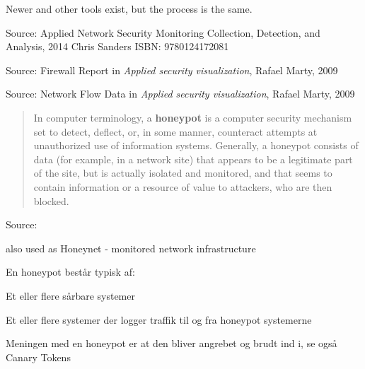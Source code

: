 \documentclass[Screen16to9,17pt]{foils}
\begin{document}
Newer and other tools exist, but the process is the same.

Source: Applied Network Security Monitoring Collection, Detection, and Analysis, 2014 Chris Sanders ISBN: 9780124172081





Source: Firewall Report in \emph{Applied security visualization}, Rafael Marty, 2009




Source: Network Flow Data in \emph{Applied security visualization}, Rafael Marty, 2009




\vskip 1cm
\begin{quote}
In computer terminology, a {\bf honeypot} is a computer security mechanism set to detect, deflect, or, in some manner, counteract attempts at unauthorized use of information systems. Generally, a honeypot consists of data (for example, in a network site) that appears to be a legitimate part of the site, but is actually isolated and monitored, and that seems to contain information or a resource of value to attackers, who are then blocked.
\end{quote}

Source:

also used as Honeynet - monitored network infrastructure

\begin{list1}
\item En honeypot består typisk af:
  \begin{list2}
    \item Et eller flere sårbare systemer
\item Et eller flere systemer der logger traffik til og fra honeypot
  systemerne
  \end{list2}
\item Meningen med en honeypot er at den bliver angrebet og brudt ind
  i, se også Canary Tokens
\end{list1}



\end{document}
